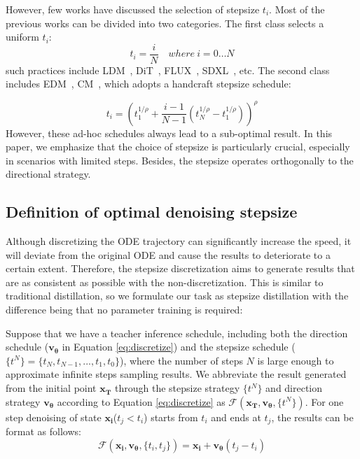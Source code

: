 \documentclass[10pt,twocolumn,letterpaper]{article}
\begin{document}
    However, few works have discussed the selection of stepsize $t_i$. 
    Most of the previous works can be divided into two categories. The first class selects a uniform $t_i$:
    \begin{equation}
        t_i = \frac{i}{N} \quad where\ i = 0 \ldots N
    \end{equation}
    such practices include LDM~\cite{ldm}, DiT~\cite{dit}, FLUX~\cite{flux}, SDXL~\cite{sdxl}, etc. The second class includes EDM~\cite{edm}, CM~\cite{cm}, which adopts a handcraft stepsize schedule:

    \begin{equation}
        \label{eq:edm}t_{i}= (t_{1}^{1/\rho}+ \frac{i-1}{N-1}(t_{N}^{1/\rho}- t_{1}
        ^{1/\rho}))^{\rho}
    \end{equation}
    However, these ad-hoc schedules always lead to a sub-optimal result. In this paper, we emphasize that the choice of stepsize is particularly crucial, especially in scenarios with limited steps. Besides, the stepsize operates orthogonally to the directional strategy.
    
    

    \subsection{Definition of optimal denoising stepsize}

    
    Although discretizing the ODE trajectory can significantly increase the speed, it will deviate from the original ODE and cause the results to deteriorate to a certain extent. Therefore, the stepsize discretization aims to generate results that are as consistent as possible with the non-discretization. This is similar to traditional distillation, so we formulate our task as stepsize distillation with the difference being that no parameter training is required:

    Suppose that we have a teacher inference schedule, including both the direction schedule ($\bm{v_{\theta}}$ in Equation \ref{eq:discretize}) and the stepsize schedule ($\{t^N\} = \{t_{N},t_{N-1},...,t_{1},t_{0}\}$), where the number of steps $N$ is large enough to approximate infinite steps sampling results. We abbreviate the result generated from the initial point $\bm{x_T}$ through the stepsize strategy $\{t^N\}$ and direction strategy $\bm{v_\theta}$ according to Equation \ref{eq:discretize} as $\mathcal{F}(\bm{x_T},\bm{v_\theta},\{t^N\})$.
    For one step denoising of state $\bm{x_i}$($t_j < t_i$) starts from $t_i$ and ends at $t_j$, the results can be format as follows: 
    \begin{equation}
        \label{eq:onestep}
        \mathcal{F}(\bm{x_i}, \bm{v_\theta}, \{t_i,t_j\}) = \bm{x_i} + \bm{v_\theta} (t_j - t_i)
    \end{equation}
\end{document}

